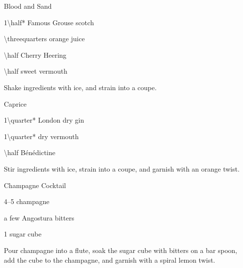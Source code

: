 \begin{Cocktail}[\PDT]{Blood and Sand}
  \begin{Ingredients}
  \item \SI{1\half*}{\oz} Famous Grouse scotch
  \item \SI{\threequarters}{\oz} orange juice
  \item \SI{\half}{\oz} Cherry Heering
  \item \SI{\half}{\oz} sweet vermouth
  \end{Ingredients}
  
  \begin{Instructions}
	Shake ingredients with ice, and strain into a coupe.
  \end{Instructions}
\end{Cocktail}

\begin{Cocktail}[\PDT]{Caprice}
  \begin{Ingredients}
  \item \SI{1\quarter*}{\oz} London dry gin
  \item \SI{1\quarter*}{\oz} dry vermouth
  \item \SI{\half}{\oz} B\'en\'edictine
  \end{Ingredients}
  
  \begin{Instructions}
	Stir ingredients with ice, strain into a coupe, and garnish with an orange twist.
  \end{Instructions}
\end{Cocktail}

\begin{Cocktail}[\PDT]{Champagne Cocktail}
  \begin{Ingredients}
  \item \SIrange{4}{5}{\oz} champagne
  \item a few \si{\dashes} Angostura bitters
  \item 1 sugar cube
  \end{Ingredients}
  
  \begin{Instructions}
	Pour champagne into a flute, soak the sugar cube with bitters on a bar spoon, add the cube to the champagne, and garnish with a spiral lemon twist.
  \end{Instructions}
\end{Cocktail}

